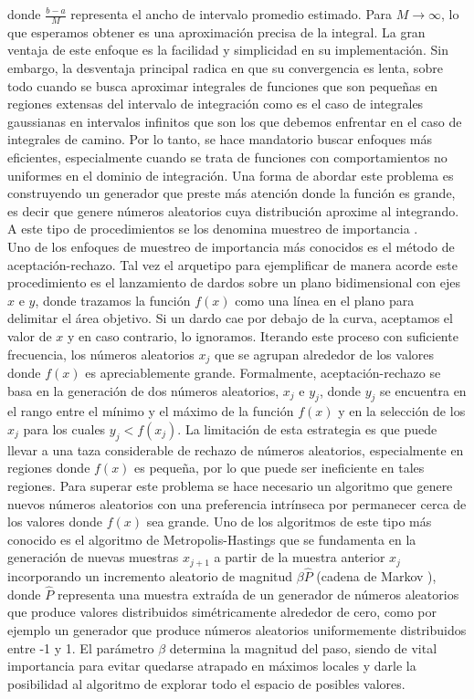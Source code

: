 \documentclass[11pt,a4paper]{article}
\begin{document}
donde $\frac{b-a}{M}$ representa el ancho de intervalo promedio estimado. Para $M \rightarrow \infty$, lo que esperamos obtener es una aproximación precisa de la integral. La gran ventaja de este enfoque es la facilidad y simplicidad en su implementaci\'on. Sin embargo, la desventaja principal radica en que su convergencia es lenta, sobre todo cuando se busca aproximar integrales de funciones que son peque\~nas en regiones extensas del intervalo de integraci\'on como es el caso de integrales gaussianas en intervalos infinitos que son los que debemos enfrentar en el caso de integrales de camino. Por lo tanto, se hace mandatorio buscar enfoques m\'as eficientes, especialmente cuando se trata de funciones con comportamientos no uniformes en el dominio de integración. Una forma de abordar este problema es construyendo un generador que preste m\'as atenci\'on donde la funci\'on es grande, es decir que genere n\'umeros aleatorios cuya distribuci\'on aproxime al integrando. A este tipo de procedimientos se los denomina muestreo de importancia \cite{ziemann2021quantum, cowan1998statistical, rubinstein2016simulation}.\\
Uno de los enfoques de muestreo de importancia m\'as conocidos es el m\'etodo de aceptaci\'on-rechazo. Tal vez el arquetipo para ejemplificar de manera acorde este procedimiento es el lanzamiento de dardos sobre un plano bidimensional con ejes $x$ e $y$, donde trazamos la funci\'on $f(x)$ como una l\'inea en el plano para delimitar el \'area objetivo. Si un dardo cae por debajo de la curva, aceptamos el valor de $x$ y en caso contrario, lo ignoramos. Iterando este proceso con suficiente frecuencia, los n\'umeros aleatorios $x_j$ que se agrupan alrededor de los valores donde $f(x)$ es apreciablemente grande. Formalmente, aceptaci\'on-rechazo se basa en la generaci\'on de dos n\'umeros aleatorios, $x_j$ e $y_j$, donde $y_j$ se encuentra en el rango entre el m\'inimo y el m\'aximo de la funci\'on $f(x)$ y en la selecci\'on de los $x_j$ para los cuales $y_j < f(x_j)$. La limitaci\'on de esta estrategia es que puede llevar a una taza considerable de rechazo de n\'umeros aleatorios, especialmente en regiones donde $f(x)$ es peque\~na, por lo que puede ser ineficiente en tales regiones. Para superar este problema se hace necesario un algoritmo que genere nuevos n\'umeros aleatorios con una preferencia intr\'inseca por permanecer cerca de los valores donde $f(x)$ sea grande. Uno de los algoritmos de este tipo m\'as conocido es el algoritmo de Metropolis-Hastings que se fundamenta en la generaci\'on de nuevas muestras $x_{j+1}$ a partir de la muestra anterior $x_j$ incorporando un incremento aleatorio de magnitud $\beta \hat{P}$ (cadena de Markov \cite{rubinstein2016simulation}), donde $\hat{P}$ representa una muestra extra\'ida de un generador de n\'umeros aleatorios que produce valores distribuidos sim\'etricamente alrededor de cero, como por ejemplo un generador que produce n\'umeros aleatorios uniformemente distribuidos entre -1 y 1. El par\'ametro $\beta$ determina la magnitud del paso, siendo de vital importancia para evitar quedarse atrapado en m\'aximos locales y darle la posibilidad al algoritmo de explorar todo el espacio de posibles valores.\\
\end{document}
